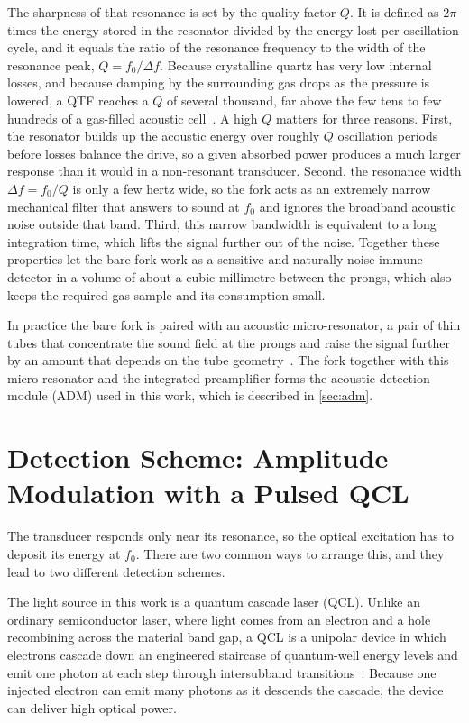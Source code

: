 The sharpness of that resonance is set by the quality factor $Q$. It is defined as $2\pi$ times the energy stored in the resonator divided by the energy lost per oscillation cycle, and it equals the ratio of the resonance frequency to the width of the resonance peak, $Q = f_0/\Delta f$. Because crystalline quartz has very low internal losses, and because damping by the surrounding gas drops as the pressure is lowered, a QTF reaches a $Q$ of several thousand, far above the few tens to few hundreds of a gas-filled acoustic cell~\cite{patimisco2014}. A high $Q$ matters for three reasons. First, the resonator builds up the acoustic energy over roughly $Q$ oscillation periods before losses balance the drive, so a given absorbed power produces a much larger response than it would in a non-resonant transducer. Second, the resonance width $\Delta f = f_0/Q$ is only a few hertz wide, so the fork acts as an extremely narrow mechanical filter that answers to sound at $f_0$ and ignores the broadband acoustic noise outside that band. Third, this narrow bandwidth is equivalent to a long integration time, which lifts the signal further out of the noise. Together these properties let the bare fork work as a sensitive and naturally noise-immune detector in a volume of about a cubic millimetre between the prongs, which also keeps the required gas sample and its consumption small.

In practice the bare fork is paired with an acoustic micro-resonator, a pair of thin tubes that concentrate the sound field at the prongs and raise the signal further by an amount that depends on the tube geometry~\cite{dong2010}. The fork together with this micro-resonator and the integrated preamplifier forms the acoustic detection module (ADM) used in this work, which is described in \cref{sec:adm}.

\section{Detection Scheme: Amplitude Modulation with a Pulsed QCL}
\label{sec:detection}

The transducer responds only near its resonance, so the optical excitation has to deposit its energy at $f_0$. There are two common ways to arrange this, and they lead to two different detection schemes.

The light source in this work is a quantum cascade laser (QCL). Unlike an ordinary semiconductor laser, where light comes from an electron and a hole recombining across the material band gap, a QCL is a unipolar device in which electrons cascade down an engineered staircase of quantum-well energy levels and emit one photon at each step through intersubband transitions~. Because one injected electron can emit many photons as it descends the cascade, the device can deliver high optical power.

